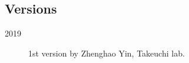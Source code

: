 \documentclass{kuee_en}
\begin{document}
\begin{acknowledgements}
\lipsum[2]
\end{acknowledgements}

\printbibliography[title=References,heading=bibintoc]

\clearpage %
\processdelayedfloats
\clearpage

\begin{appendices}
\chapter{Versions}
\begin{description}
  \item[2019] 1st version by Zhenghao Yin, Takeuchi lab.
\end{description}
\end{appendices}
\end{document}
